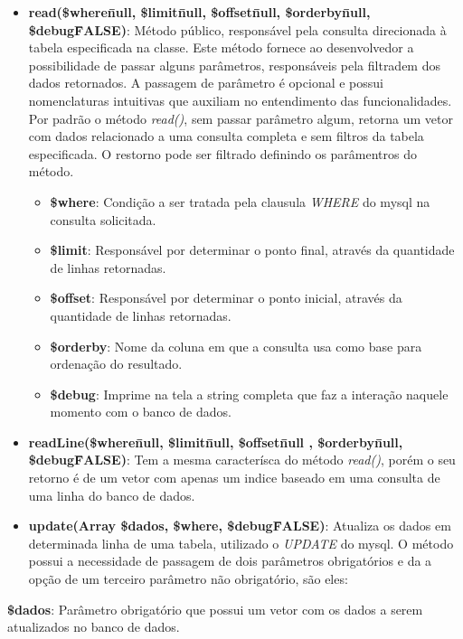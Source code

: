\begin{itemize}
                \item\textbf{read(\$where\=null, \$limit\=null, \$offset\=null, \$orderby\=null, \$debug\=FALSE)}: Método público, responsável pela consulta direcionada à tabela especificada na classe. Este método fornece ao desenvolvedor a possibilidade de passar alguns parâmetros, responsáveis pela filtradem dos dados retornados. A passagem de parâmetro é opcional e possui nomenclaturas intuitivas que auxiliam no entendimento das funcionalidades. Por padrão o método \emph{read()}, sem passar parâmetro algum, retorna um vetor com dados relacionado a uma consulta completa e sem filtros da tabela especificada. O restorno pode ser filtrado definindo os parâmentros do método.
                \begin{itemize}
                    \item\textbf{\$where}: Condição a ser tratada pela clausula \emph{WHERE} do mysql na consulta solicitada.
                    \item\textbf{\$limit}: Responsável por determinar o ponto final, através da quantidade de linhas retornadas.
                    \item\textbf{\$offset}: Responsável por determinar o ponto inicial, através da quantidade de linhas retornadas.
                    \item\textbf{\$orderby}: Nome da coluna em que a consulta usa como base para ordenação do resultado.
                    \item\textbf{\$debug}: Imprime na tela a string completa que faz a interação naquele momento com o banco de dados.
                \end{itemize}

                \item\textbf{readLine(\$where\=null, \$limit\=null, \$offset\=null , \$orderby\=null, \$debug\=FALSE)}: Tem a mesma caracterísca do método \emph{read()}, porém o seu retorno é de um vetor com apenas um indice baseado em uma consulta de uma linha do banco de dados.

                \item\textbf{update(Array \$dados, \$where, \$debug\=FALSE)}: Atualiza os dados em determinada linha de uma tabela, utilizado o \emph{UPDATE} do mysql. O método possui a necessidade de passagem de dois parâmetros obrigatórios e da a opção de um terceiro parâmetro não obrigatório, são eles:
                \end{itemize}
                    \item\textbf{\$dados}: Parâmetro obrigatório que possui um vetor com os dados a serem atualizados no banco de dados.

